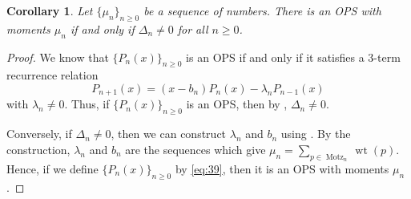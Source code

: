\documentclass[oneside]{book}
\numberwithin{equation}{section}
\newtheorem{cor}[thm]{Corollary}
\theoremstyle{definition}
\newcommand\Motz{\operatorname{Motz}}
\newcommand\wt{\operatorname{wt}}
\begin{document}
\begin{cor}\label{cor:4}
  Let \( \{ \mu_n\}_{n\ge 0} \) be a sequence of numbers. There is an
  OPS with moments \( \mu_n \) if and only if \( \Delta_n \ne 0 \) for
  all \( n \ge 0 \).
\end{cor}

\begin{proof}
  We know that \( \{ P_n(x) \}_{n\ge 0} \) is an OPS
  if and only if it satisfies a 3-term recurrence relation
  \begin{equation}\label{eq:39}
    P_{n+1}(x) = (x-b_n) P_n(x) - \lambda_n P_{n-1}(x)
  \end{equation}
  with \( \lambda_n\ne 0 \). Thus, if \( \{ P_n(x) \}_{n\ge 0} \) is
  an OPS, then by , \( \Delta_n\ne 0 \).

  Conversely, if \( \Delta_n\ne 0 \), then we can construct
  \( \lambda_n \) and \( b_n \) using . By the
  construction, \( \lambda_n \) and \( b_n \) are the sequences which
  give \( \mu_n = \sum_{p\in \Motz_n} \wt(p) \). Hence, if we define
  \( \{ P_n(x) \}_{n\ge 0} \) by \eqref{eq:39}, then it is an OPS with
  moments \( \mu_n \).
\end{proof}
\end{document}
